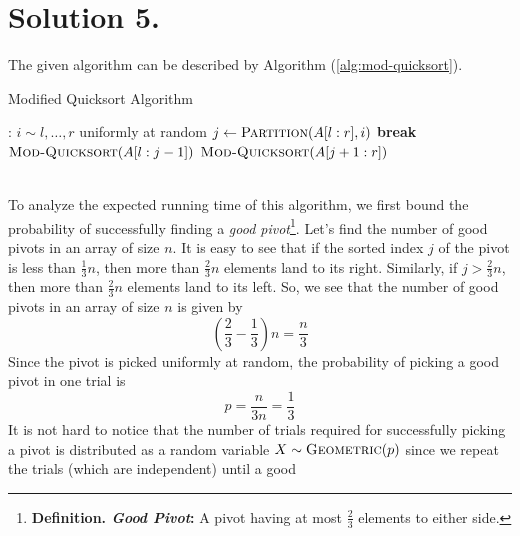\documentclass[9pt]{article}
\begin{document}
\section*{\textbf{Solution 5.}}
The given algorithm can be described by Algorithm (\ref{alg:mod-quicksort}).
\begin{algorithm}
    \caption{Modified Quicksort Algorithm}
    \label{alg:mod-quicksort}
    \begin{algorithmic}[1]
        :
                \State \Return
            \EndIf
                \State $i \sim l, \dots, r$ uniformly at random
                \State $j \gets \Call{Partition}{A[l:r], i}$
                    \State \textbf{break}
                \EndIf
            \EndWhile
            \State $\Call{Mod-Quicksort}{A[l:j-1]}$
            \State $\Call{Mod-Quicksort}{A[j+1:r]}$
        \EndProcedure
    \end{algorithmic}
\end{algorithm}
\vspace*{0pt} \\
To analyze the expected running time of this algorithm, we first bound the probability of
successfully finding a \textit{good pivot}\footnote{\textbf{Definition. \textit{Good Pivot}:} A pivot
having at most $\frac{2}{3}$ elements to either side.}. Let's find the number of good pivots
in an array of size $n$. It is easy to see that if the sorted index $j$ of the pivot is less than
$\frac{1}{3} n$, then more than $\frac{2}{3} n$ elements land to its right. Similarly, if $j > \frac{2}{3} n$,
then more than $\frac{2}{3} n$ elements land to its left. So, we see that the number of good pivots
in an array of size $n$ is given by
\begin{equation}
    \label{good-pivot}
    \left( \frac{2}{3} - \frac{1}{3} \right) n = \frac{n}{3}
\end{equation}
Since the pivot is picked uniformly at random, the probability of picking a good pivot in one trial
is
\begin{equation}
    \label{prob-good-pivot}
    p = \frac{n}{3n} = \frac{1}{3}
\end{equation}
It is not hard to notice that the number of trials required for successfully picking a pivot is distributed
as a random variable $X \sim \textsc{Geometric}(p)$ since we repeat the trials (which are independent) until a good
\end{document}
